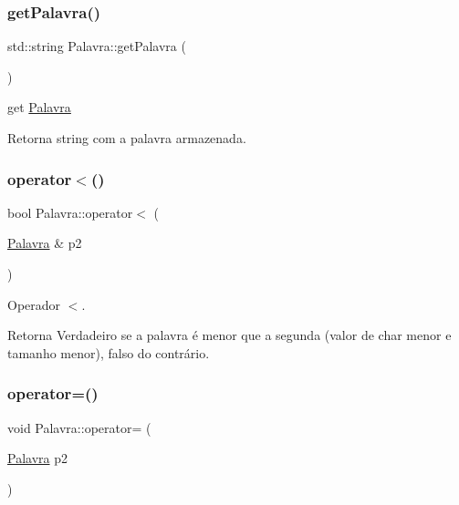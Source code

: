 \subsubsection{\texorpdfstring{get\+Palavra()}{getPalavra()}}
{\footnotesize\ttfamily std\+::string Palavra\+::get\+Palavra (\begin{DoxyParamCaption}{ }\end{DoxyParamCaption})}



get \hyperlink{classPalavra}{Palavra} 

\begin{DoxyReturn}{Retorna}
string com a palavra armazenada. 
\end{DoxyReturn}
\mbox{\label{classPalavra_a2b9f86de9d71ca9f35f63c5644ec2891}} 
\subsubsection{\texorpdfstring{operator$<$()}{operator<()}}
{\footnotesize\ttfamily bool Palavra\+::operator$<$ (\begin{DoxyParamCaption}\item[{\hyperlink{classPalavra}{Palavra} \&}]{p2 }\end{DoxyParamCaption})}



Operador $<$. 

\begin{DoxyReturn}{Retorna}
Verdadeiro se a palavra é menor que a segunda (valor de char menor e tamanho menor), falso do contrário. 
\end{DoxyReturn}
\mbox{\label{classPalavra_a0cd3f5e0a73d58968554e1843bed52ea}} 
\subsubsection{\texorpdfstring{operator=()}{operator=()}}
{\footnotesize\ttfamily void Palavra\+::operator= (\begin{DoxyParamCaption}\item[{\hyperlink{classPalavra}{Palavra}}]{p2 }\end{DoxyParamCaption})}



